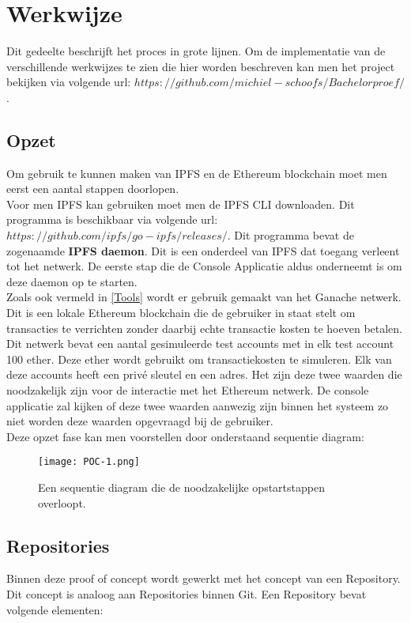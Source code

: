 \section{Werkwijze}
Dit gedeelte beschrijft het proces in grote lijnen. Om de implementatie van de verschillende werkwijzes te zien die hier worden beschreven kan men het project bekijken via volgende url: $https://github.com/michiel-schoofs/Bachelorproef/$.
\subsection{Opzet}
Om gebruik te kunnen maken van IPFS en de Ethereum blockchain moet men eerst een aantal stappen doorlopen.\\

Voor men IPFS kan gebruiken moet men de IPFS CLI downloaden. Dit programma is beschikbaar via volgende url: $https://github.com/ipfs/go-ipfs/releases/$. Dit programma bevat de zogenaamde \textbf{IPFS daemon}. Dit is een onderdeel van IPFS dat toegang verleent tot het netwerk. De eerste stap die de Console Applicatie aldus onderneemt is om deze daemon op te starten.\\

Zoals ook vermeld in \ref{Tools} wordt er gebruik gemaakt van het Ganache netwerk. Dit is een lokale Ethereum blockchain die de gebruiker in staat stelt om transacties te verrichten zonder daarbij echte transactie kosten te hoeven betalen. Dit netwerk bevat een aantal gesimuleerde test accounts met in elk test account 100 ether. Deze ether wordt gebruikt om transactiekosten te simuleren. Elk van deze accounts heeft een privé sleutel en een adres. Het zijn deze twee waarden die noodzakelijk zijn voor de interactie met het Ethereum netwerk. De console applicatie zal kijken of deze twee waarden aanwezig zijn binnen het systeem zo niet worden deze waarden opgevraagd bij de gebruiker.\\

Deze opzet fase kan men voorstellen door onderstaand sequentie diagram:

\begin{figure}[h!]
\centering
\texttt{[image: POC-1.png]}
\caption[POC opstart]{Een sequentie diagram die de noodzakelijke opstartstappen overloopt. }
\end{figure}

\subsection{Repositories}
Binnen deze proof of concept wordt gewerkt met het concept van een Repository. Dit concept is analoog aan Repositories binnen Git. Een Repository bevat volgende elementen:

